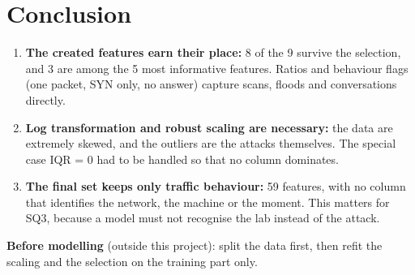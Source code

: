 \documentclass[11pt,a4paper]{article}
\begin{document}
\section{Conclusion}

\begin{enumerate}
  \item \textbf{The created features earn their place:} 8 of the 9 survive the selection, and 3 are among the 5 most
        informative features. Ratios and behaviour flags (one packet, SYN only, no answer) capture scans, floods and
        conversations directly.
  \item \textbf{Log transformation and robust scaling are necessary:} the data are extremely skewed, and the outliers are
        the attacks themselves. The special case IQR = 0 had to be handled so that no column dominates.
  \item \textbf{The final set keeps only traffic behaviour:} 59 features, with no column that identifies the network, the
        machine or the moment. This matters for SQ3, because a model must not recognise the lab instead of the attack.
\end{enumerate}
\textbf{Before modelling} (outside this project): split the data first, then refit the scaling and the selection on the
training part only.
\end{document}
